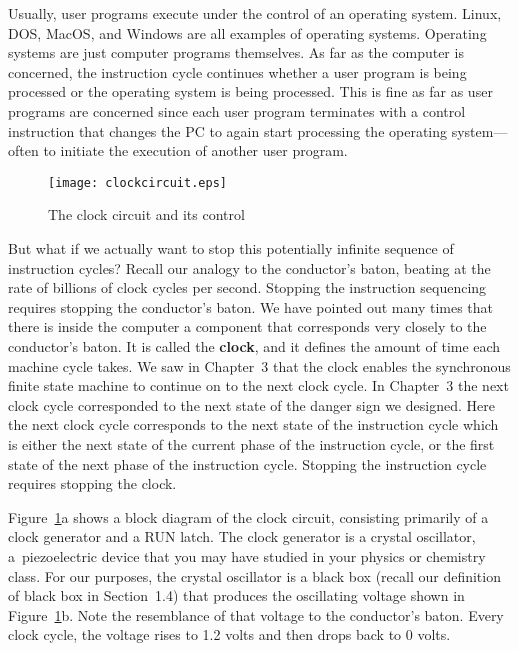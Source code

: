 \documentclass{patt}
\begin{document}
Usually, user programs execute under the control of an operating system.  
Linux, DOS, MacOS, and Windows are all examples of operating systems.  
Operating systems are just computer programs themselves.  As far as the 
computer is concerned, the instruction cycle continues whether a user program 
is being processed or the
operating system is being processed.  This is fine as far as user
programs are concerned since each user program terminates with a control instruction that
changes the PC to again start processing the operating system---often 
to initiate the execution of another user program.


\begin{figure}[b]
\centerline{\texttt{[image: clockcircuit.eps]}}
\caption{The clock circuit and its control}
\label{fig:clock}
\end{figure}

\enlargethispage{6pt}

But what if we actually want to stop this potentially infinite
sequence of instruction cycles?  Recall our analogy to the conductor's
baton, beating at the rate of billions of clock cycles per second.
Stopping the instruction sequencing requires stopping the conductor's
baton.  We have pointed out many times that there is inside the
computer a component that corresponds very closely to the conductor's
baton.  It is called the {\bf clock}, and it defines the amount of time 
each machine cycle takes.  We saw in Chapter~3 that the clock enables 
the synchronous  finite state machine to continue on to the next
clock cycle.  In Chapter~3 the next clock cycle corresponded to the 
next state of the danger sign we designed.  Here the next clock cycle 
corresponds to the next state of the instruction cycle which is  either the 
next state of the current phase of the instruction cycle, or the first state of the next phase of the instruction cycle.  Stopping the instruction cycle requires stopping the clock.


Figure~\ref{fig:clock}a shows a block diagram of the clock circuit, 
consisting primarily
of a clock generator and a RUN latch.  The clock generator is a crystal
oscillator, a~piezoelectric device that you may have studied in your physics
or chemistry class.  For our purposes, the crystal oscillator is a black box
(recall our definition of black box in Section~1.4) that produces the
oscillating voltage shown in Figure~\ref{fig:clock}b.  Note the resemblance 
of that voltage to the conductor's baton.  Every clock cycle, the voltage 
rises to 1.2 volts and then drops back to 0 volts.
\end{document}
